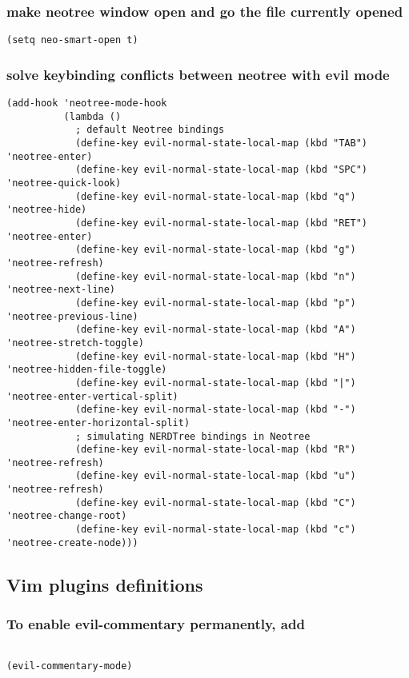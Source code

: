 \documentclass[11pt]{article}
\begin{document}
\subsubsection*{make neotree window open and go the file currently opened}
\label{sec:org7149eb4}
\begin{verbatim}
(setq neo-smart-open t)
\end{verbatim}


\subsubsection*{solve keybinding conflicts between neotree with evil mode}
\label{sec:org89b8858}
\begin{verbatim}
(add-hook 'neotree-mode-hook
          (lambda ()
            ; default Neotree bindings
            (define-key evil-normal-state-local-map (kbd "TAB") 'neotree-enter)
            (define-key evil-normal-state-local-map (kbd "SPC") 'neotree-quick-look)
            (define-key evil-normal-state-local-map (kbd "q") 'neotree-hide)
            (define-key evil-normal-state-local-map (kbd "RET") 'neotree-enter)
            (define-key evil-normal-state-local-map (kbd "g") 'neotree-refresh)
            (define-key evil-normal-state-local-map (kbd "n") 'neotree-next-line)
            (define-key evil-normal-state-local-map (kbd "p") 'neotree-previous-line)
            (define-key evil-normal-state-local-map (kbd "A") 'neotree-stretch-toggle)
            (define-key evil-normal-state-local-map (kbd "H") 'neotree-hidden-file-toggle)
            (define-key evil-normal-state-local-map (kbd "|") 'neotree-enter-vertical-split)
            (define-key evil-normal-state-local-map (kbd "-") 'neotree-enter-horizontal-split)
            ; simulating NERDTree bindings in Neotree
            (define-key evil-normal-state-local-map (kbd "R") 'neotree-refresh)
            (define-key evil-normal-state-local-map (kbd "u") 'neotree-refresh)
            (define-key evil-normal-state-local-map (kbd "C") 'neotree-change-root)
            (define-key evil-normal-state-local-map (kbd "c") 'neotree-create-node)))
\end{verbatim}



\subsection*{Vim plugins definitions}
\label{sec:orgedcd99d}

\subsubsection*{To enable evil-commentary permanently, add}
\label{sec:org1236532}
\begin{verbatim}

(evil-commentary-mode)
\end{verbatim}
\end{document}
